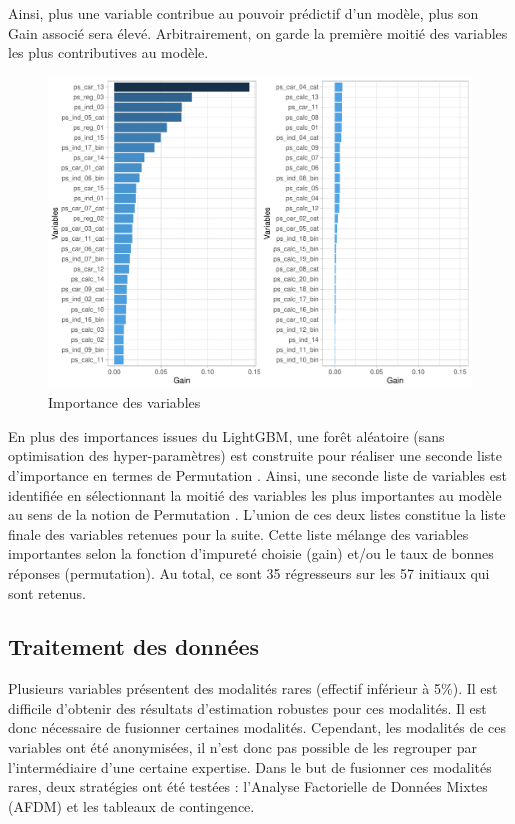 \documentclass[french]{article}
\begin{document}
\begin{multicols}{2}
Ainsi, plus une variable contribue au pouvoir prédictif d'un modèle, plus son \og Gain \fg{} associé sera élevé. Arbitrairement, on garde la première moitié des variables les plus contributives au modèle.

\begin{figure}[H] \centering
  \includegraphics[width = \columnwidth]{img/var_imp_lgb}
  \caption{Importance des variables}
\end{figure}

En plus des importances issues du LightGBM, une forêt aléatoire (sans optimisation des hyper-paramètres) est construite pour réaliser une seconde liste d'importance en termes de \og Permutation \fg{} \cite{rb1}. Ainsi, une seconde liste de variables est identifiée en sélectionnant la moitié des variables les plus importantes au modèle au sens de la notion de \og Permutation \fg. L'union de ces deux listes constitue la liste finale des variables retenues pour la suite. Cette liste mélange des variables importantes selon la fonction d'impureté choisie (gain) et/ou le taux de bonnes réponses (permutation). Au total, ce sont 35 régresseurs sur les 57 initiaux qui sont retenus.

\subsection{Traitement des données}

Plusieurs variables présentent des modalités rares (effectif inférieur à 5\%). Il est difficile d'obtenir des résultats d'estimation robustes pour ces modalités. Il est donc nécessaire de fusionner certaines modalités. Cependant, les modalités de ces variables ont été anonymisées, il n'est donc pas possible de les regrouper par l'intermédiaire d'une certaine expertise. Dans le but de fusionner ces modalités rares, deux stratégies ont été testées :  l'Analyse Factorielle de Données Mixtes (AFDM) et les tableaux de contingence.


\end{multicols}
\end{document}

